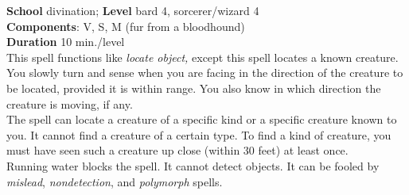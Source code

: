 \textbf{School} divination; \textbf{Level} bard 4, sorcerer/wizard 4\\
\textbf{Components}: V, S, M (fur from a bloodhound)\\
\textbf{Duration} 10 min./level\\
This spell functions like \textit{locate object, }except this spell locates a known creature. You slowly turn and sense when you are facing in the direction of the creature to be located, provided it is within range. You also know in which direction the creature is moving, if any.\\
The spell can locate a creature of a specific kind or a specific creature known to you. It cannot find a creature of a certain type. To find a kind of creature, you must have seen such a creature up close (within 30 feet) at least once.\\
Running water blocks the spell. It cannot detect objects. It can be fooled by \textit{mislead}, \textit{nondetection}, and \textit{polymorph }spells.\\
